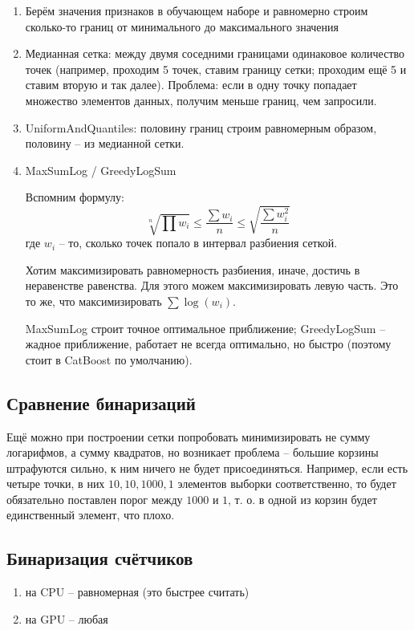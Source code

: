 \documentclass[a4paper,12pt]{article}
\begin{document}
\begin{enumerate}[noitemsep]
    \item Берём значения признаков в обучающем наборе и равномерно строим сколько-то границ от минимального до максимального значения
    \item Медианная сетка: между двумя соседними границами одинаковое количество точек (например, проходим 5 точек, ставим границу сетки; проходим ещё 5 и ставим вторую и так далее).
    Проблема: если в одну точку попадает множество элементов данных, получим меньше границ, чем запросили.
    \item UniformAndQuantiles: половину границ строим равномерным образом, половину -- из медианной сетки.
    \item MaxSumLog / GreedyLogSum

    Вспомним формулу:
    $$ \sqrt[n]{\prod w_i} \le \frac{\sum w_i}{n} \le \sqrt{\frac{\sum w_i^2}{n}} $$
    где $w_i$ -- то, сколько точек попало в интервал разбиения сеткой.

    Хотим максимизировать равномерность разбиения, иначе, достичь в неравенстве равенства. Для этого можем максимизировать левую часть.
    Это то же, что максимизировать $ \sum \log(w_i) $.

    MaxSumLog строит точное оптимальное приближение; GreedyLogSum -- жадное приближение, работает не всегда оптимально, но быстро (поэтому стоит в CatBoost по умолчанию).
\end{enumerate}

\subsection{Сравнение бинаризаций}

Ещё можно при построении сетки попробовать минимизировать не сумму логарифмов, а сумму квадратов, но возникает проблема -- большие корзины штрафуются сильно, к ним ничего не будет присоединяться.
Например, если есть четыре точки, в них $10, 10, 1000, 1$ элементов выборки соответственно, то будет обязательно поставлен порог между $1000$ и $1$, т. о. в одной из корзин будет единственный элемент, что плохо.

\subsection{Бинаризация счётчиков}

\begin{enumerate}[noitemsep]
    \item на CPU -- равномерная (это быстрее считать)
    \item на GPU -- любая
\end{enumerate}
\end{document}
